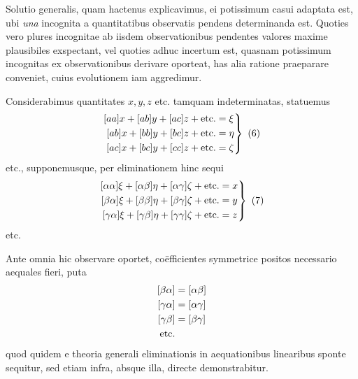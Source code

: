 Solutio generalis, quam hactenus explicavimus, ei potissimum casui adaptata est, ubi \textit{una} incognita a quantitatibus observatis pendens determinanda est. Quoties vero plures incognitae ab iisdem observationibus pendentes valores maxime plausibiles exspectant, vel quoties adhuc incertum est, quasnam potissimum incognitas ex observationibus derivare oporteat, has alia ratione praeparare conveniet, cuius evolutionem iam aggredimur.

Considerabimus quantitates \(x,y,z\) etc. tamquam indeterminatas, statuemus
\[
\left.\begin{aligned}\relax
[aa]x+[ab]y+[ac]z+\text{etc.}&=\xi\\
[ab]x+[bb]y+[bc]z+\text{etc.}&=\eta\\
[ac]x+[bc]y+[cc]z+\text{etc.}&=\zeta
\end{aligned}\right\}\ (6)
\]
etc., supponemusque, per eliminationem hinc sequi
\[
\left.\begin{aligned}\relax
[\alpha\alpha]\xi+[\alpha\beta]\eta+[\alpha\gamma]\zeta+\text{etc.}&=x\\
[\beta\alpha]\xi+[\beta\beta]\eta+[\beta\gamma]\zeta+\text{etc.}&=y\\
[\gamma\alpha]\xi+[\gamma\beta]\eta+[\gamma\gamma]\zeta+\text{etc.}&=z
\end{aligned}\right\}\ (7)
\]
etc.

Ante omnia hic observare oportet, coëfficientes symmetrice positos necessario aequales fieri, puta
\[
\begin{aligned}\relax
[\beta\alpha]&=[\alpha\beta]\\
[\gamma\alpha]&=[\alpha\gamma]\\
[\gamma\beta]&=[\beta\gamma]\\
\text{etc.}&
\end{aligned}
\]
quod quidem e theoria generali eliminationis in aequationibus linearibus sponte sequitur, sed etiam infra, absque illa, directe demonstrabitur.

